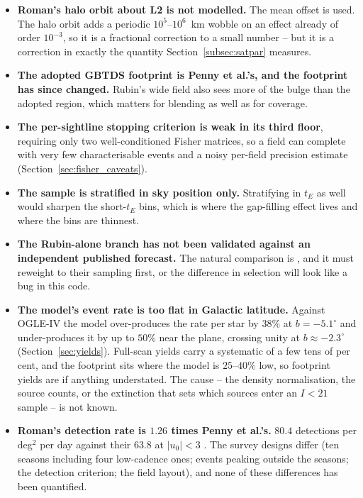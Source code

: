 \documentclass[english,10pt,a4paper]{article}
\begin{document}
\begin{itemize}
		\item \textbf{Roman's halo orbit about L2 is not modelled.} The mean offset is used. The halo orbit adds a periodic $10^{5}$--$10^{6}$~km wobble on an effect already of order $10^{-3}$, so it is a fractional correction to a small number -- but it is a correction in exactly the quantity Section~\ref{subsec:satpar} measures.

		\item \textbf{The adopted GBTDS footprint is Penny et al.'s, and the footprint has since changed.} Rubin's wide field also sees more of the bulge than the adopted region, which matters for blending as well as for coverage.

		\item \textbf{The per-sightline stopping criterion is weak in its third floor}, requiring only two well-conditioned Fisher matrices, so a field can complete with very few characterisable events and a noisy per-field precision estimate (Section~\ref{sec:fisher_caveats}).

		\item \textbf{The sample is stratified in sky position only.} Stratifying in $t_E$ as well would sharpen the short-$t_E$ bins, which is where the gap-filling effect lives and where the bins are thinnest.

		\item \textbf{The Rubin-alone branch has not been validated against an independent published forecast.} The natural comparison is \cite{Abrams2025MicrolensingRubin}, and it must reweight to their sampling first, or the difference in selection will look like a bug in this code.
			\item \textbf{The model's event rate is too flat in Galactic latitude.} Against OGLE-IV \cite{Mroz2019OGLEIV} the model over-produces the rate per star by $38\%$ at $b=-5.1^\circ$ and under-produces it by up to $50\%$ near the plane, crossing unity at $b\approx-2.3^\circ$ (Section~\ref{sec:yields}). Full-scan yields carry a systematic of a few tens of per cent, and the footprint sits where the model is $25$--$40\%$ low, so footprint yields are if anything understated. The cause -- the density normalisation, the source counts, or the extinction that sets which sources enter an $I<21$ sample -- is not known.

		\item \textbf{Roman's detection rate is $1.26$ times Penny et al.'s.} $80.4$ detections per deg$^2$ per day against their $63.8$ at $|u_0|<3$ \cite{penny2019predictions}. The survey designs differ (ten seasons including four low-cadence ones; events peaking outside the seasons; the detection criterion; the field layout), and none of these differences has been quantified.


\end{itemize}
\end{document}
